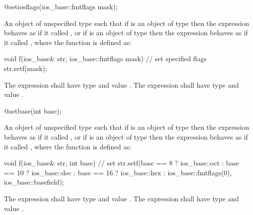 %
\begin{itemdecl}
@\unspec@ setiosflags(ios_base::fmtflags mask);
\end{itemdecl}

\begin{itemdescr}
\pnum
\returns
An object of unspecified type such that if
is an object of type
then the expression
behaves as if it called
,
or if
is an object of type
then the expression
behaves as if it called
, where the function  is defined as:
%

\begin{codeblock}
void f(ios_base& str, ios_base::fmtflags mask) {
  // set specified flags
  str.setf(mask);
}
\end{codeblock}

The expression
shall have type
and value
.
The expression
shall have type
and value
.
\end{itemdescr}

%
\begin{itemdecl}
@\unspec@ setbase(int base);
\end{itemdecl}

\begin{itemdescr}
\pnum
\returns
An object of unspecified type such that if
is an object of type
then the expression
behaves as if it called
,
or if
is an object of type
then the expression
behaves as if it called
, where the function  is defined as:

\begin{codeblock}
void f(ios_base& str, int base) {
  // set 
  str.setf(base ==  8 ? ios_base::oct :
      base == 10 ? ios_base::dec :
      base == 16 ? ios_base::hex :
      ios_base::fmtflags(0), ios_base::basefield);
}
\end{codeblock}

The expression
shall have type
and value
.
The expression
shall have type
and value
.
\end{itemdescr}

